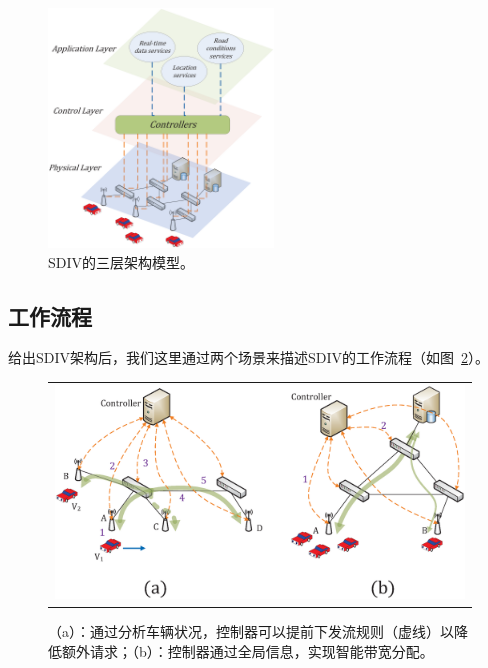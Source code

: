 \documentclass{ctexart}
\begin{document}
\begin{figure} [t]
\begin{center}
\includegraphics[width=0.9\columnwidth,height=2.5in]{figures/fig-2-24.eps}
\vspace{-0.2in}
\caption{SDIV的三层架构模型。} \label{fig2}
\end{center}
\vspace{-0.3in}
\end{figure}

\subsection{工作流程}

给出SDIV架构后，我们这里通过两个场景来描述SDIV的工作流程（如图~\ref{fig3}）。



\begin{figure} [t]
\begin{center}
\begin{tabular}{c}
\includegraphics[width=1\columnwidth]{figures/fig-3-29.eps} \\
\end{tabular}
\caption{（a）：通过分析车辆状况，控制器可以提前下发流规则（虚线）以降低额外请求；（b）：控制器通过全局信息，实现智能带宽分配。} \label{fig3}
  \end{center}
  \vspace{-0.3in}
\end{figure}
\end{document}
